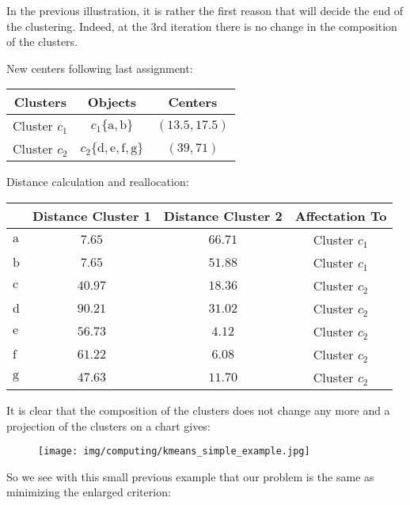 	In the previous illustration, it is rather the first reason that will decide the end of the clustering. Indeed, at the 3rd iteration there is no change in the composition of the clusters.
	
	New centers following last assignment:
	\begin{table}[H]
		\centering
		\begin{tabular}{|c|c|c|}
		\hline
		\rowcolor[HTML]{9B9B9B} 
		\textbf{Clusters} & \textbf{Objects} & \textbf{Centers} \\ \hline
		Cluster $c_1$ & $c_1\{\mathrm{a},\mathrm{b}\}$ & $(13.5,17.5)$ \\ \hline
		Cluster $c_2$ & $c_2\{\mathrm{d},\mathrm{e},\mathrm{f},\mathrm{g}\}$ & $(39,71)$ \\ \hline
		\end{tabular}
	\end{table}
	Distance calculation and reallocation:
	\begin{table}[H]
		\centering
		\begin{tabular}{|l|c|c|c|}
		\hline
		\rowcolor[HTML]{9B9B9B} 
		\multicolumn{1}{|c|}{\cellcolor[HTML]{9B9B9B}\textbf{Objects}} & \textbf{Distance Cluster 1} & \textbf{Distance Cluster 2} & \textbf{Affectation To} \\ \hline
		$\mathrm{a}$ & $7.65$ & $66.71$ & Cluster $c_1$ \\ \hline
		$\mathrm{b}$ & $7.65$ & $51.88$ & Cluster $c_1$ \\ \hline
		$\mathrm{c}$ & $40.97$ & $18.36$ & Cluster $c_2$ \\ \hline
		$\mathrm{d}$ & $90.21$ & $31.02$ & Cluster $c_2$ \\ \hline
		$\mathrm{e}$ & $56.73$ & $4.12$ & Cluster $c_2$ \\ \hline
		$\mathrm{f}$ & $61.22$ & $6.08$ & Cluster $c_2$ \\ \hline
		$\mathrm{g}$ & $47.63$ & $11.70$ & Cluster $c_2$ \\ \hline
		\end{tabular}
	\end{table}
	It is clear that the composition of the clusters does not change any more and a projection of the clusters on a chart gives:
	\begin{figure}[H]
		\centering
		\texttt{[image: img/computing/kmeans\_simple\_example.jpg]}
	\end{figure}
	
	So we see with this small previous example that our problem is the same as minimizing the enlarged criterion:
	
